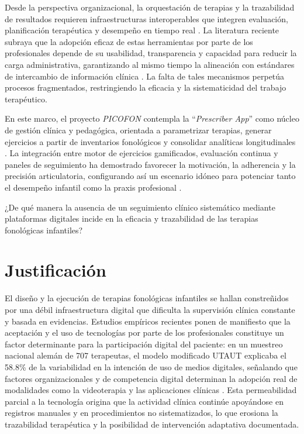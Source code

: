 \documentclass[12pt, oneside]{article}
\begin{document}
Desde la perspectiva organizacional, la orquestación de terapias y la trazabilidad de resultados requieren infraestructuras interoperables que integren evaluación, planificación terapéutica y desempeño en tiempo real \parencite{ONC2024HTI1,ONC2024SB}. La literatura reciente subraya que la adopción eficaz de estas herramientas por parte de los profesionales depende de su usabilidad, transparencia y capacidad para reducir la carga administrativa, garantizando al mismo tiempo la alineación con estándares de intercambio de información clínica \parencite{Leinweber2023,Gijbels2024}. La falta de tales mecanismos perpetúa procesos fragmentados, restringiendo la eficacia y la sistematicidad del trabajo terapéutico.

En este marco, el proyecto \textit{PICOFON} contempla la “\textit{Prescriber App}” como núcleo de gestión clínica y pedagógica, orientada a parametrizar terapias, generar ejercicios a partir de inventarios fonológicos y consolidar analíticas longitudinales \parencite{Kim2023,Vonthron2024}. La integración entre motor de ejercicios gamificados, evaluación continua y paneles de seguimiento ha demostrado favorecer la motivación, la adherencia y la precisión articulatoria, configurando así un escenario idóneo para potenciar tanto el desempeño infantil como la praxis profesional \parencite{Bertoni2024,Zhou2025}.

¿De qué manera la ausencia de un seguimiento clínico sistemático mediante plataformas digitales incide en la eficacia y trazabilidad de las terapias fonológicas infantiles?

\section{Justificación}

El diseño y la ejecución de terapias fonológicas infantiles se hallan constreñidos por una débil infraestructura digital que dificulta la supervisión clínica constante y basada en evidencias. Estudios empíricos recientes ponen de manifiesto que la aceptación y el uso de tecnologías por parte de los profesionales constituye un factor determinante para la participación digital del paciente: en un muestreo nacional alemán de 707 terapeutas, el modelo modificado UTAUT explicaba el 58.8\% de la variabilidad en la intención de uso de medios digitales, señalando que factores organizacionales y de competencia digital determinan la adopción real de modalidades como la videoterapia y las aplicaciones clínicas \parencite{Leinweber2023}. Esta permeabilidad parcial a la tecnología origina que la actividad clínica continúe apoyándose en registros manuales y en procedimientos no sistematizados, lo que erosiona la trazabilidad terapéutica y la posibilidad de intervención adaptativa documentada.
\end{document}
